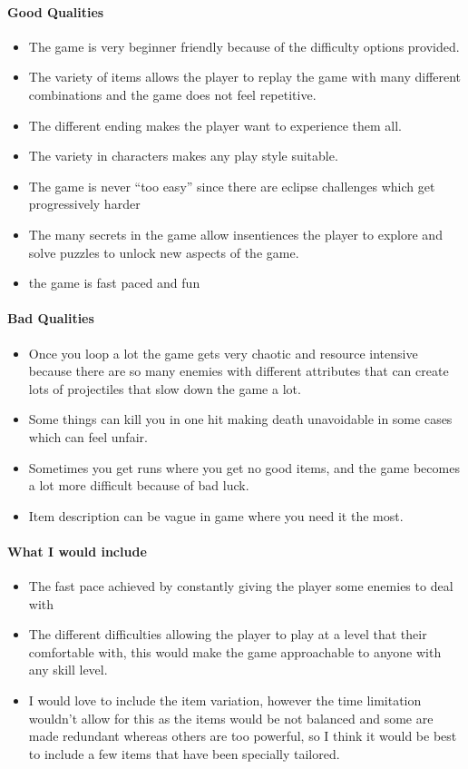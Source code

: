 \documentclass{article}
\begin{document}
\paragraph{Good Qualities}
\begin{itemize}
\item The game is very beginner friendly because of the difficulty options provided.
\item The variety of items allows the player to replay the game with many different combinations and the game does not feel repetitive. 
\item The different ending makes the player want to experience them all.  
\item The variety in characters makes any play style suitable. 
\item The game is never “too easy” since there are eclipse challenges which get progressively harder
\item The many secrets in the game allow insentiences the player to explore and solve puzzles to unlock new aspects of the game.
\item the game is fast paced and fun
\end{itemize}


\paragraph{Bad Qualities}
\begin{itemize}
\item Once you loop a lot the game gets very chaotic and resource intensive because there are so many enemies with different attributes that can create lots of projectiles that slow down the game a lot.  
\item Some things can kill you in one hit making death unavoidable in some cases which can feel unfair. 
\item Sometimes you get runs where you get no good items, and the game becomes a lot more difficult because of bad luck. 
\item Item description can be vague in game where you need it the most.
\end{itemize}


\paragraph{What I would include}
\begin{itemize}
\item The fast pace achieved by constantly giving the player some enemies to deal with
\item The different difficulties allowing the player to play at a level that their comfortable with, this would make the game approachable to anyone with any skill level.
\item I would love to include the item variation, however the time limitation wouldn't allow for this as the items would be not balanced and some are made redundant whereas others are too powerful, so I think it would be best to include a few items that have been specially tailored.
\end{itemize}
\end{document}
